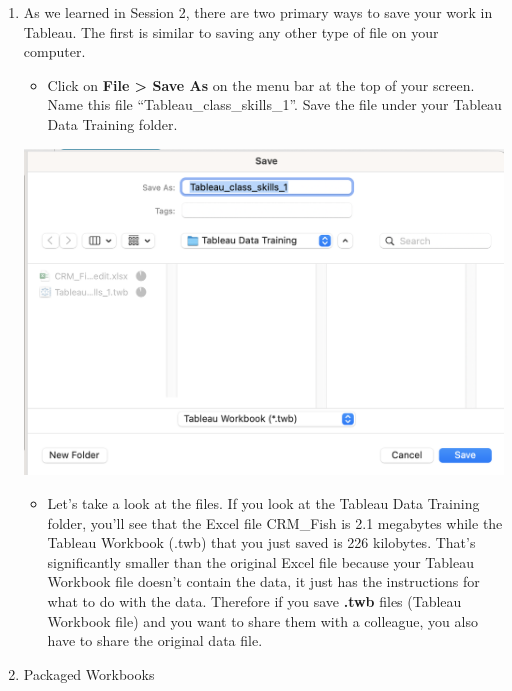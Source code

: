 \documentclass[
]{book}
\providecommand{\tightlist}{%
  \setlength{\itemsep}{0pt}\setlength{\parskip}{0pt}}
\begin{document}
\begin{enumerate}
\def\labelenumi{\arabic{enumi}.}
\item
  As we learned in Session 2, there are two primary ways to save your work in Tableau. The first is similar to saving any other type of file on your computer.

  \begin{itemize}
  \tightlist
  \item
    Click on \textbf{File \textgreater{} Save As} on the menu bar at the top of your screen. Name this file ``Tableau\_class\_skills\_1''. Save the file under your Tableau Data Training folder.
  \end{itemize}

  \includegraphics{images/M3S2_save-as.png}

  \begin{itemize}
  \tightlist
  \item
    Let's take a look at the files. If you look at the Tableau Data Training folder, you'll see that the Excel file CRM\_Fish is 2.1 megabytes while the Tableau Workbook (.twb) that you just saved is 226 kilobytes. That's significantly smaller than the original Excel file because your Tableau Workbook file doesn't contain the data, it just has the instructions for what to do with the data. Therefore if you save \textbf{.twb} files (Tableau Workbook file) and you want to share them with a colleague, you also have to share the original data file.
  \end{itemize}
\item
  Packaged Workbooks


\end{enumerate}
\end{document}

